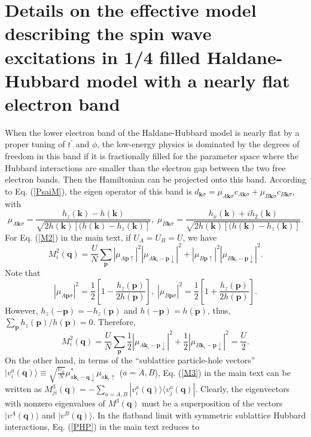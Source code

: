 \documentclass[amsmath,superscriptaddress,showpacs,aps,prl,twocolumn]{revtex4-1}
\begin{document}
\section{Details on the effective model describing the spin wave excitations in 1/4 filled Haldane-Hubbard model with a nearly flat electron band}
\par When the lower electron band of the Haldane-Hubbard model is nearly flat by a proper tuning of $t^\prime$ and $\phi$, the low-energy physics is dominated by the degrees of freedom in this band if it is fractionally filled for the parameter space where the Hubbard interactions are smaller than the electron gap between the two free electron bands. Then the Hamiltonian can be projected onto this band. According to Eq. (\ref{PsaiM}), the eigen operator of this band is $d_{\mathbf{k}\sigma}=\mu_{A\mathbf{k}\sigma}c_{A\mathbf{k}\sigma}+\mu_{B\mathbf{k}\sigma}c_{B\mathbf{k}\sigma}$, with
\begin{equation*}
\mu_{A\mathbf{k}\sigma} =  \frac{h_z(\mathbf{k})-h(\mathbf{k})}{\sqrt{2h(\mathbf{k})\left[(h(\mathbf{k})-h_z(\mathbf{k})\right]}}, \;
\mu_{B\mathbf{k}\sigma} =  \frac{h_x(\mathbf{k})+ih_2(\mathbf{k})}{\sqrt{2h(\mathbf{k})\left[(h(\mathbf{k})-h_z(\mathbf{k})\right]}}.
\end{equation*}
For Eq. (\ref{M2}) in the main text, if $U_A=U_B=U$, we have
\begin{equation*}
M^2_i(\mathbf{q})=\frac{U}{N}\sum_{\mathbf{p}}\left|\mu_{A\mathbf{p}\uparrow}\right|^2\left|\mu_{A\mathbf{k}_i-\mathbf{p}\downarrow}\right|^2
                 +\left|\mu_{B\mathbf{p}\uparrow}\right|^2\left|\mu_{B\mathbf{k}_i-\mathbf{p}\downarrow}\right|^2.
\end{equation*}
Note that
\begin{equation*}
\left|\mu_{A\mathbf{p}\sigma}\right|^2 = \frac{1}{2}\left[1-\frac{h_z(\mathbf{p})}{2h(\mathbf{p})}\right],\;
\left|\mu_{B\mathbf{p}\sigma}\right|^2 = \frac{1}{2}\left[1+\frac{h_z(\mathbf{p})}{2h(\mathbf{p})}\right].
\end{equation*}
However, $h_z(-\mathbf{p})=-h_z(\mathbf{p})$ and $h(-\mathbf{p})=h(\mathbf{p})$, thus, $\sum_{\mathbf{p}}h_z(\mathbf{p})/h(\mathbf{p})=0$. Therefore,
\begin{equation*}
M^2_i(\mathbf{q})=\frac{U}{N}\sum_{\mathbf{p}}\frac{1}{2}\left|\mu_{A\mathbf{k}_i-\mathbf{p}\downarrow}\right|^2
                 +\frac{1}{2}\left|\mu_{B\mathbf{k}_i-\mathbf{p}\downarrow}\right|^2
                 =\frac{U}{2}.
\end{equation*}
On the other hand, in terms of the ``sublattice particle-hole vectors'' $|v^a_i(\mathbf{q})\rangle\equiv\sqrt{\frac{U_a}{N}}\mu^{\ast}_{a\mathbf{k}_i-\mathbf{q}\downarrow}\mu_{a\mathbf{k}_{i}\uparrow}$ ($a=A,B$), Eq. (\ref{M3}) in the main text can be written as $M^3_{ji}(\mathbf{q})=-\sum_{a=A,B}|v^a_i(\mathbf{q})\rangle\langle v^a_j(\mathbf{q})|$. Clearly, the eigenvectors with nonzero eigenvalues of $M^3(\mathbf{q})$ must be a superposition of the vectors $|v^A(\mathbf{q})\rangle$ and $|v^B(\mathbf{q})\rangle$. In the flatband limit with symmetric sublattice Hubbard interactions, Eq. (\ref{PHP}) in the main text reduces to
\end{document}
